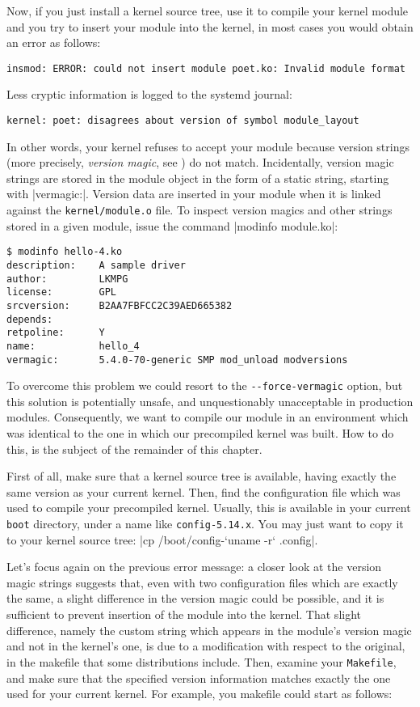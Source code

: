 \documentclass[10pt, oneside]{book}
\begin{document}
Now, if you just install a kernel source tree, use it to compile your kernel module and you try to insert your module into the kernel, in most cases you would obtain an error as follows:

\begin{verbatim}
insmod: ERROR: could not insert module poet.ko: Invalid module format
\end{verbatim}

Less cryptic information is logged to the systemd journal:

\begin{verbatim}
kernel: poet: disagrees about version of symbol module_layout
\end{verbatim}

In other words, your kernel refuses to accept your module because version strings (more precisely, \textit{version magic}, see ) do not match.
Incidentally, version magic strings are stored in the module object in the form of a static string, starting with \cpp|vermagic:|.
Version data are inserted in your module when it is linked against the \verb|kernel/module.o| file.
To inspect version magics and other strings stored in a given module, issue the command \sh|modinfo module.ko|:

\begin{verbatim}
$ modinfo hello-4.ko
description:    A sample driver
author:         LKMPG
license:        GPL
srcversion:     B2AA7FBFCC2C39AED665382
depends:
retpoline:      Y
name:           hello_4
vermagic:       5.4.0-70-generic SMP mod_unload modversions
\end{verbatim}

To overcome this problem we could resort to the \verb|--force-vermagic| option, but this solution is potentially unsafe, and unquestionably unacceptable in production modules.
Consequently, we want to compile our module in an environment which was identical to the one in which our precompiled kernel was built.
How to do this, is the subject of the remainder of this chapter.

First of all, make sure that a kernel source tree is available, having exactly the same version as your current kernel.
Then, find the configuration file which was used to compile your precompiled kernel.
Usually, this is available in your current \verb|boot| directory, under a name like \verb|config-5.14.x|.
You may just want to copy it to your kernel source tree: \sh|cp /boot/config-`uname -r` .config|.

Let's focus again on the previous error message: a closer look at the version magic strings suggests that, even with two configuration files which are exactly the same, a slight difference in the version magic could be possible, and it is sufficient to prevent insertion of the module into the kernel.
That slight difference, namely the custom string which appears in the module's version magic and not in the kernel's one, is due to a modification with respect to the original, in the makefile that some distributions include.
Then, examine your \verb|Makefile|, and make sure that the specified version information matches exactly the one used for your current kernel.
For example, you makefile could start as follows:
\end{document}
